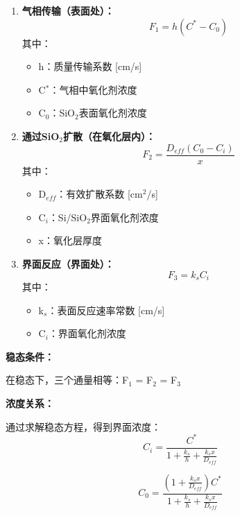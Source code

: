 \documentclass[UTF8,12pt,a4paper]{ctexart}
\begin{document}
\begin{enumerate}
    \item \textbf{气相传输（表面处）：}
    \begin{equation}
    F_1 = h(C^* - C_0)
    \end{equation}
    其中：
    \begin{itemize}
        \item h：质量传输系数 [cm/s]
        \item C$^*$：气相中氧化剂浓度
        \item C$_0$：SiO$_2$表面氧化剂浓度
    \end{itemize}
    
    \item \textbf{通过SiO$_2$扩散（在氧化层内）：}
    \begin{equation}
    F_2 = \frac{D_{eff}(C_0 - C_i)}{x}
    \end{equation}
    其中：
    \begin{itemize}
        \item D$_{eff}$：有效扩散系数 [cm$^2$/s]
        \item C$_i$：Si/SiO$_2$界面氧化剂浓度
        \item x：氧化层厚度
    \end{itemize}
    
    \item \textbf{界面反应（界面处）：}
    \begin{equation}
    F_3 = k_s C_i
    \end{equation}
    其中：
    \begin{itemize}
        \item k$_s$：表面反应速率常数 [cm/s]
        \item C$_i$：界面氧化剂浓度
    \end{itemize}
\end{enumerate}

\textbf{稳态条件：}

在稳态下，三个通量相等：F$_1$ = F$_2$ = F$_3$

\textbf{浓度关系：}

通过求解稳态方程，得到界面浓度：
\begin{equation}
C_i = \frac{C^*}{1 + \frac{k_s}{h} + \frac{k_s x}{D_{eff}}}
\end{equation}

\begin{equation}
C_0 = \frac{(1 + \frac{k_s x}{D_{eff}})C^*}{1 + \frac{k_s}{h} + \frac{k_s x}{D_{eff}}}
\end{equation}
\end{document}
